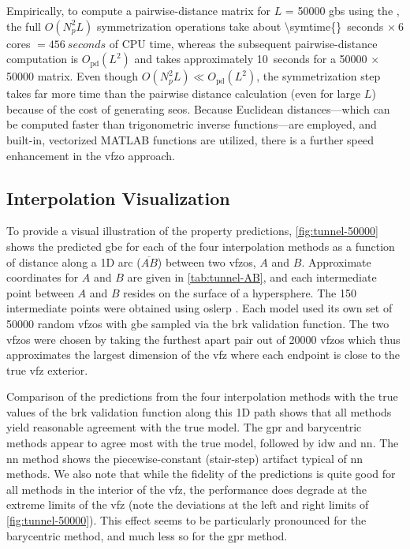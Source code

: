 \documentclass[final,twocolumn,12pt]{elsarticle}
\begin{document}
Empirically, to compute a pairwise-distance matrix for $L$ = \num{50000} \glspl{gb} using the \vfzorepo{} \cite{bairdFiveDegreeofFreedom5DOF2020}, the full $O(N_p^2L)$ symmetrization operations take about \SI{\symtime{}}{seconds} $\times\ 6$ cores $= \SI{456}{seconds}$ of CPU time, whereas the subsequent pairwise-distance computation is $O_{\text{pd}}(L^2)$ and takes approximately \SI{10}{seconds} for a \num{50000} $\times$ \num{50000} matrix. Even though $O(N_p^2L) \ll O_{\text{pd}}(L^2)$, the symmetrization step takes far more time than the pairwise distance calculation (even for large $L$) because of the cost of generating \glspl{seo}. Because Euclidean distances---which can be computed faster than trigonometric inverse functions---are employed, and built-in, vectorized MATLAB functions are utilized, there is a further speed enhancement in the \gls{vfzo} approach. %

\subsection{Interpolation Visualization}
To provide a visual illustration of the property predictions, \cref{fig:tunnel-50000} shows the predicted \gls{gbe} for each of the four interpolation methods as a function of distance along a 1D arc ($\overline{AB}$) between two \glspl{vfzo}, $A$ and $B$. Approximate coordinates for $A$ and $B$ are given in \cref{tab:tunnel-AB}, and each intermediate point between $A$ and $B$ resides on the surface of a hypersphere. The \num{150} intermediate points were obtained using \gls{oslerp} \cite{francisGeodesicOctonionMetric2019}. Each model used its own set of \num{50000} random \inpt{} \glspl{vfzo} with \gls{gbe} sampled via the \gls{brk} validation function. The two \glspl{vfzo} were chosen by taking the furthest apart pair out of \num{20000} \glspl{vfzo} which thus approximates the largest dimension of the \gls{vfz} where each endpoint is close to the true \gls{vfz} exterior. 

Comparison of the predictions from the four interpolation methods with the true values of the \gls{brk} validation function along this 1D path shows that all methods yield reasonable agreement with the true model. The \gls{gpr} and barycentric methods appear to agree most with the true model, followed by \gls{idw} and \gls{nn}. The \gls{nn} method shows the piecewise-constant (stair-step) artifact typical of \gls{nn} methods. We also note that while the fidelity of the predictions is quite good for all methods in the interior of the \gls{vfz}, the performance does degrade at the extreme limits of the \gls{vfz} (note the deviations at the left and right limits of \cref{fig:tunnel-50000}). This effect seems to be particularly pronounced for the barycentric method, and much less so for the \gls{gpr} method.
\end{document}
